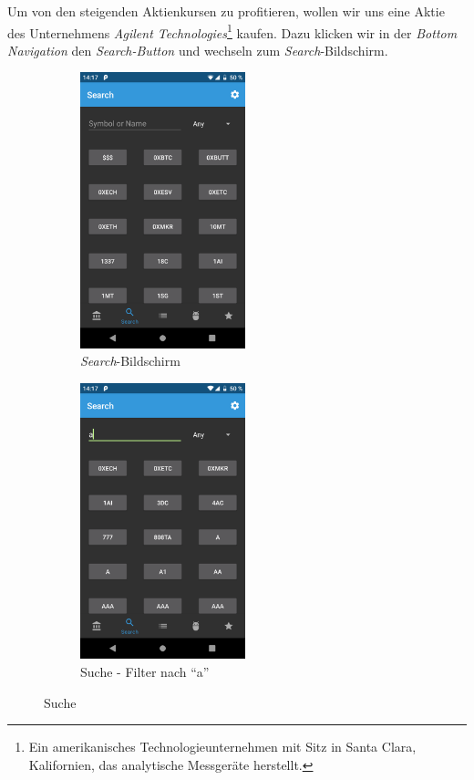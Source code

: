 \documentclass[a4paper]{article}
\begin{document}
 Um von den steigenden Aktienkursen zu profitieren, wollen wir uns eine Aktie des Unternehmens \textit{Agilent Technologies}\footnote{Ein amerikanisches Technologieunternehmen mit Sitz in Santa Clara, Kalifornien, das analytische Messgeräte herstellt.} kaufen.
Dazu klicken wir in der \textit{Bottom Navigation} den \textit{Search-Button} und wechseln zum \textit{Search}-Bildschirm.

\begin{figure}[H]
	\begin{subfigure}{.5\textwidth}
		\centering
		\includegraphics[height=8cm,keepaspectratio]{./images/demo/search.png}
		\caption{\textit{Search}-Bildschirm}
		\label{fig:demo:search_screen}
	\end{subfigure}
	\begin{subfigure}{.5\textwidth}
		\centering
		\includegraphics[height=8cm,keepaspectratio]{./images/demo/search_a.png}
		\caption{Suche - Filter nach "`a"'}
		\label{fig:demo:search_a}
	\end{subfigure}
	\caption{Suche}
	\label{fig:demo:search}
\end{figure}
\end{document}
